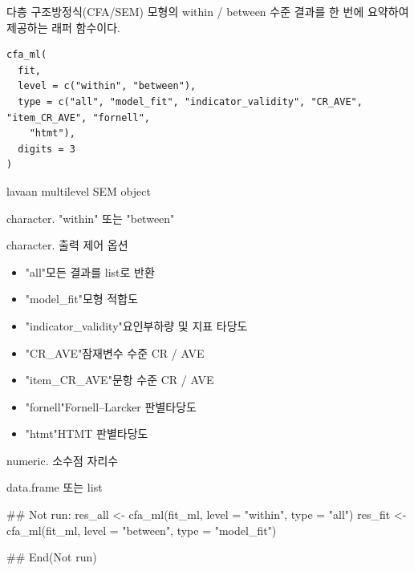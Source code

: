 \documentclass[a4paper]{book}
\begin{document}
%
\begin{Description}
다층 구조방정식(CFA/SEM) 모형의 within / between 수준 결과를
한 번에 요약하여 제공하는 래퍼 함수이다.
\end{Description}
%
\begin{Usage}
\begin{verbatim}
cfa_ml(
  fit,
  level = c("within", "between"),
  type = c("all", "model_fit", "indicator_validity", "CR_AVE", "item_CR_AVE", "fornell",
    "htmt"),
  digits = 3
)
\end{verbatim}
\end{Usage}
%
\begin{Arguments}
\begin{ldescription}
\item[\code{fit}] lavaan multilevel SEM object

\item[\code{level}] character. "within" 또는 "between"

\item[\code{type}] character. 출력 제어 옵션
\begin{itemize}

\item{} "all"모든 결과를 list로 반환
\item{} "model\_fit"모형 적합도
\item{} "indicator\_validity"요인부하량 및 지표 타당도
\item{} "CR\_AVE"잠재변수 수준 CR / AVE
\item{} "item\_CR\_AVE"문항 수준 CR / AVE
\item{} "fornell"Fornell–Larcker 판별타당도
\item{} "htmt"HTMT 판별타당도

\end{itemize}


\item[\code{digits}] numeric. 소수점 자리수
\end{ldescription}
\end{Arguments}
%
\begin{Value}
data.frame 또는 list
\end{Value}
%
\begin{Examples}
\begin{ExampleCode}
## Not run: 
res_all <- cfa_ml(fit_ml, level = "within", type = "all")
res_fit <- cfa_ml(fit_ml, level = "between", type = "model_fit")

## End(Not run)
\end{ExampleCode}
\end{Examples}
\end{document}
